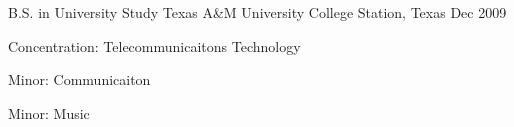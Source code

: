 

\begin{cventries}

  \cventry
    {B.S. in University Study} %
    {Texas A\&M University} %
    {College Station, Texas} %
    {Dec 2009} %
    {
      \begin{cvitems}
          \item {Concentration: Telecommunicaitons Technology} %
          \item {Minor: Communicaiton} %
          \item {Minor: Music} %
      \end{cvitems}
    }

\end{cventries}
